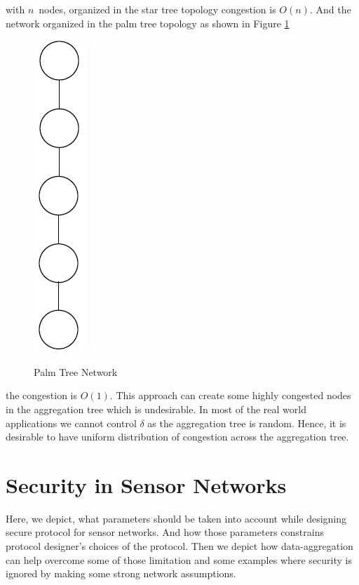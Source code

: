 	with $n$\ nodes, organized in the star tree topology congestion is $O(n)$.
	And the network organized in the palm tree topology as shown in Figure \ref{fig:palm-tree-network}
	\begin{figure}[h!]
		\centering
		\includegraphics[scale = 1]{images/palm-tree.png}\\
		\caption{Palm Tree Network}
		\label{fig:palm-tree-network}
	\end{figure}
	the congestion is $O(1)$.
	This approach can create some highly congested nodes in the aggregation tree which is undesirable.
	In most of the real world applications we cannot control $\delta$ as the aggregation tree is random.
	Hence, it is desirable to have uniform distribution of congestion across the aggregation tree.



\section{Security in Sensor Networks}
	\label{sec:aggregate-adversary}
	Here, we depict, what parameters should be taken into account while designing secure protocol for sensor networks.  
	And how those parameters constrains protocol designer's choices of the protocol.
	Then we depict how data-aggregation can help overcome some of those limitation and some examples where security is ignored by making some strong network assumptions.

